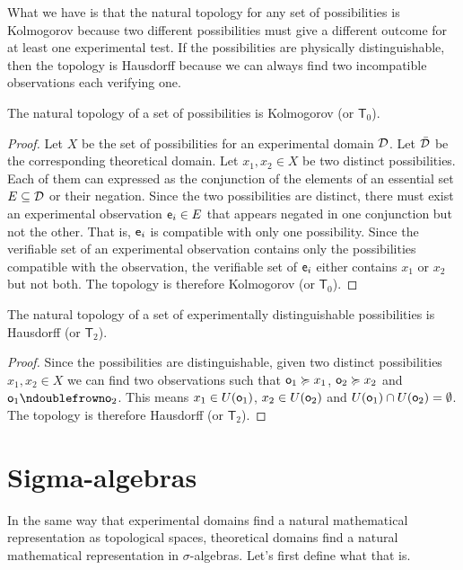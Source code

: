 \documentclass[11pt,letterpaper,fleqn]{memoir} %
\begin{document}
What we have is that the natural topology for any set of possibilities is Kolmogorov because two different possibilities must give a different outcome for at least one experimental test. If the possibilities are physically distinguishable, then the topology is Hausdorff because we can always find two incompatible observations each verifying one.

\begin{mathSection}
	\begin{prop}
	The natural topology of a set of possibilities is Kolmogorov (or $\mathsf{T}_0$).
\end{prop}
\begin{proof}
	Let $X$ be the set of possibilities for an experimental domain $\edomain$. Let $\tdomain$ be the corresponding theoretical domain. Let $x_1, x_2 \in X$ be two distinct possibilities. Each of them can expressed as the conjunction of the elements of an essential set $E \subseteq \edomain$ or their negation. Since the two possibilities are distinct, there must exist an experimental observation $\obs[e]_i \in E$ that appears negated in one conjunction but not the other. That is, $\obs[e]_i$ is compatible with only one possibility. Since the verifiable set of an experimental observation contains only the possibilities compatible with the observation, the verifiable set of $\obs[e]_i$ either contains $x_1$ or $x_2$ but not both. The topology is therefore Kolmogorov (or $\mathsf{T}_0$).
\end{proof}
	\begin{prop}
	The natural topology of a set of experimentally distinguishable possibilities is Hausdorff (or $\mathsf{T}_2$).
\end{prop}
\begin{proof}
	Since the possibilities are distinguishable, given two distinct possibilities $x_1, x_2 \in X$ we can find two observations such that $\obs_1 \broader x_1$, $\obs_2 \broader x_2$ and $\obs_1 \ncomp \obs_2$. This means $x_1 \in U(\obs_1)$, $x_2 \in U(\obs_2)$ and $U(\obs_1) \cap U(\obs_2) = \emptyset$. The topology is therefore Hausdorff (or $\mathsf{T}_2$).
\end{proof}
\end{mathSection}

\section{Sigma-algebras}

In the same way that experimental domains find a natural mathematical representation as topological spaces, theoretical domains find a natural mathematical representation in $\sigma$-algebras. Let's first define what that is.
\end{document}

